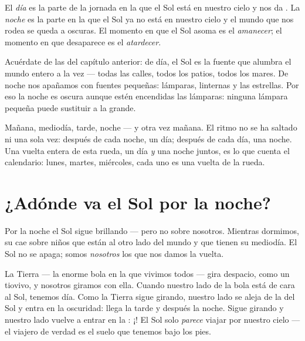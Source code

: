 \begin{definition}\label{def:g1:day-and-night:daynight}
El \emph{día} es la parte de la jornada en la que el Sol
está en nuestro cielo y nos da . La \emph{noche} es la
parte en la que el Sol ya no está en nuestro cielo y el mundo que nos
rodea se queda a oscuras. El momento en que el Sol asoma es el
\emph{amanecer}; el momento en que desaparece es el
\emph{atardecer}.
\end{definition}

\begin{remark}\label{rem:g1:day-and-night:lamp}
Acuérdate de las  del capítulo anterior: de día, el Sol
es la fuente que alumbra el mundo entero a la vez --- todas las
calles, todos los patios, todos los mares. De noche nos apañamos con
fuentes pequeñas: lámparas, linternas y las estrellas. Por eso la
noche es oscura aunque estén encendidas las lámparas: ninguna lámpara
pequeña puede sustituir a la grande.
\end{remark}

\begin{example}\label{ex:g1:day-and-night:rhythm}
Mañana, mediodía, tarde, noche --- y otra vez mañana. El ritmo no se
ha saltado ni una sola vez: después de cada noche, un día; después de
cada día, una noche. Una vuelta entera de esta rueda, un día \emph{y}
una noche juntos, es lo que cuenta el calendario: lunes, martes,
miércoles, cada uno es una vuelta de la rueda.
\end{example}

\section{¿Adónde va el Sol por la noche?}

Por la noche el Sol sigue brillando --- pero no sobre nosotros.
Mientras dormimos, su  cae sobre niños que están al otro lado del
mundo y que tienen su mediodía. El Sol no se apaga; somos
\emph{nosotros} los que nos damos la vuelta.

\begin{example}\label{ex:g1:day-and-night:spinning}
La Tierra --- la enorme bola en la que vivimos todos --- gira despacio,
como un tiovivo, y nosotros giramos con ella. Cuando nuestro lado de
la bola está de cara al Sol, tenemos día. Como la Tierra sigue
girando, nuestro lado se aleja de la  del Sol y entra en la
oscuridad: llega la tarde y después la noche. Sigue girando y nuestro
lado vuelve a entrar en la : ¡! El Sol solo
\emph{parece} viajar por nuestro cielo --- el viajero de verdad es el
suelo que tenemos bajo los pies.
\end{example}

